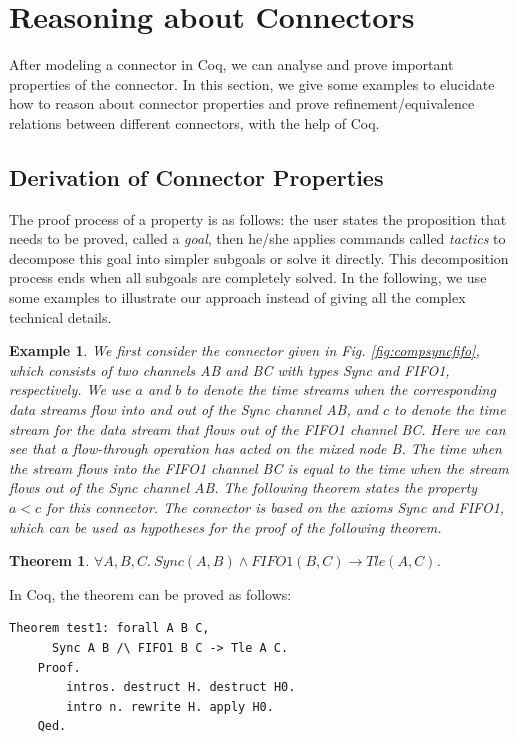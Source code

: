 \documentclass[preprint,3p]{elsarticle}
\newtheorem{example}{Example}[section]
\newtheorem{theorem}{Theorem}[section]
\begin{document}
\section{Reasoning about Connectors}\label{sec:verification}
After modeling a connector in Coq, we can analyse and prove important properties of the connector. In this section, we give some examples to elucidate how to
reason about connector properties and prove refinement/equivalence relations between different connectors, with the help of Coq.


\subsection{Derivation of Connector Properties}
The proof process of a property is as follows: the user states the proposition that needs to be proved, called a \emph{goal},
then he/she applies commands called \emph{tactics} to decompose this goal into simpler subgoals or solve it directly. This decomposition
process ends when all subgoals are completely solved. In the following, we use some examples to illustrate our approach instead of
giving all the complex technical details.
\begin{example}
We first consider the connector given in Fig. \ref{fig:compsyncfifo}, which consists of two channels \emph{AB} and \emph{BC} with types Sync and FIFO1, respectively.
We use $a$ and $b$ to denote the time streams when the corresponding data streams flow into and out of the Sync channel \emph{AB}, and
$c$ to denote the time stream for the data stream that flows out of the FIFO1 channel \emph{BC}. Here we can see that a flow-through
operation has acted on the mixed node \emph{B}. The time when the stream flows into the FIFO1 channel \emph{BC} is equal to the time when the
stream flows out of the Sync channel \emph{AB}. The following theorem states the property $a < c$ for this connector. The connector is based on the
axioms Sync and FIFO1, which can be used as hypotheses for the proof of the following theorem.
\end{example}

\begin{theorem}\label{the:tleac}
$\forall A,B,C.\:Sync(A,B)\land FIFO1(B,C) \rightarrow Tle(A,C)$.
\end{theorem}

In Coq, the theorem can be proved as follows:
\begin{lstlisting}[language=coq]
    Theorem test1: forall A B C,
      Sync A B /\ FIFO1 B C -> Tle A C.
    Proof.
        intros. destruct H. destruct H0.
        intro n. rewrite H. apply H0.
    Qed.
\end{lstlisting}
\end{document}
